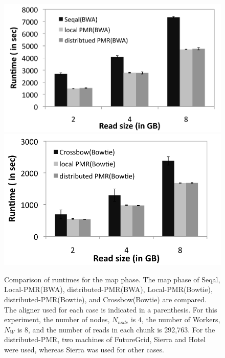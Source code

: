 \documentclass{acm_proc_article-sp}
\begin{document}
\begin{figure} 
 \centering
\includegraphics[scale=0.54]{figures/seqal_lpmr_dpmr.pdf}
\includegraphics[scale=0.59]{figures/cb_lpmr_dpmr.pdf}
\caption{\small  Comparison of runtimes for the map phase. The map phase of Seqal, Local-PMR(BWA), distributed-PMR(BWA), Local-PMR(Bowtie), distributed-PMR(Bowtie), and Crossbow(Bowtie) are compared.  The aligner used for each case is indicated in a parenthesis.  For this experiment, the number of nodes, $N_{node}$ is 4, the number of Workers, $N_W$ is 8, and the number of reads in each chunk is 292,763.  For the distributed-PMR, two machines of FutureGrid, Sierra and Hotel were used, whereas Sierra was used for other cases.}
  \label{fig:tool_comp} 


\end{figure}
\end{document}
